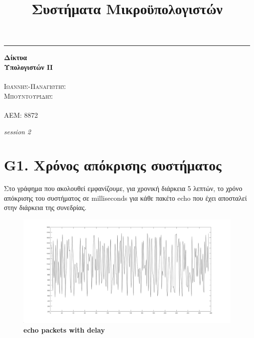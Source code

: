 \documentclass{article}
\date{\vspace{-4ex}}
\title{Συστήματα Μικροϋπολογιστών}
\begin{document}
\begin{titlepage} %
	
	\raggedleft %
	
	\rule{1pt}{\textheight} %
	\hspace{0.05\textwidth} %
	\parbox[b]{0.75\textwidth}{ %
		
		{\Huge\bfseries Δίκτυα \\[0.5\baselineskip] Υπολογιστών ΙI}\\[2\baselineskip] %
		{\large\textit{ }}\\[4\baselineskip] %
		{\Large\textsc{Ιωάννης-Παναγιώτης \\Μπουντουρίδης}} %
	\\	\\{\large\textsc{ΑΕΜ: 8872}} %
		
		\vspace{0.5\textheight} %
		
		{\noindent \textit{session 2}}\\[\baselineskip] %
	}

\end{titlepage}

\newpage
\large{}
\section*{G1. Χρόνος απόκρισης συστήματος}
Στο γράφημα που ακολουθεί εμφανίζουμε, για χρονική διάρκεια 5 λεπτών, το χρόνο απόκρισης του
συστήματος σε milliseconds για κάθε πακέτο echo που έχει αποσταλεί στην διάρκεια της συνεδρίας.

\begin{figure}[h!]
 \begin{center}
 \advance\leftskip-4cm
  \includegraphics[width=200mm,scale=0.7]{g1s2.jpg}
  \caption*{\textbf{echo packets with delay}}
  
\end{center}
\end{figure}
\end{document}
